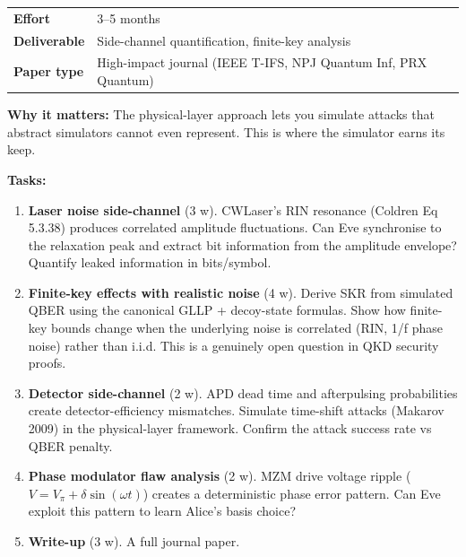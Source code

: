 \documentclass[11pt,a4paper]{article}
\begin{document}
\begin{tabular}{ll}
\toprule
\textbf{Effort} & 3--5 months \\
\textbf{Deliverable} & Side-channel quantification, finite-key analysis \\
\textbf{Paper type} & High-impact journal (IEEE T-IFS, NPJ Quantum Inf, PRX Quantum) \\
\bottomrule
\end{tabular}

\vspace{4pt}
\noindent\textbf{Why it matters:} The physical-layer approach lets you simulate attacks that
abstract simulators cannot even represent.  This is where the simulator earns its keep.

\vspace{4pt}
\noindent\textbf{Tasks:}

\begin{enumerate}[nosep]
    \item \textbf{Laser noise side-channel} (3 w).  CWLaser's RIN resonance (Coldren Eq 5.3.38)
          produces correlated amplitude fluctuations.  Can Eve synchronise to the relaxation peak
          and extract bit information from the amplitude envelope?  Quantify leaked information
          in bits/symbol.

    \item \textbf{Finite-key effects with realistic noise} (4 w).  Derive SKR from simulated
          QBER using the canonical GLLP + decoy-state formulas.  Show how finite-key bounds
          change when the underlying noise is correlated (RIN, 1/f phase noise) rather than
          i.i.d.  This is a genuinely open question in QKD security proofs.

    \item \textbf{Detector side-channel} (2 w).  APD dead time and afterpulsing probabilities
          create detector-efficiency mismatches.  Simulate time-shift attacks (Makarov 2009)
          in the physical-layer framework.  Confirm the attack success rate vs QBER penalty.

    \item \textbf{Phase modulator flaw analysis} (2 w).  MZM drive voltage ripple
          ($V = V_\pi + \delta\sin(\omega t)$) creates a deterministic phase error pattern.
          Can Eve exploit this pattern to learn Alice's basis choice?

    \item \textbf{Write-up} (3 w).  A full journal paper.
\end{enumerate}
\end{document}

